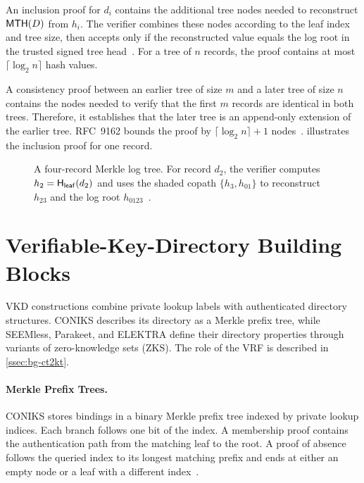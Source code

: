 An inclusion proof for $d_i$ contains the additional tree nodes needed to reconstruct $\mathsf{MTH}(D)$
from $h_i$. The verifier combines these nodes according to the leaf index and tree size, then
accepts only if the reconstructed value equals the log root in the trusted signed tree
head~\cite[Section~2.1.3]{rfc9162}. For a tree of $n$ records, the proof contains at most
$\lceil\log_2 n\rceil$ hash values.

A consistency proof between an earlier tree of size $m$ and a later tree of size $n$ contains the
nodes needed to verify that the first $m$ records are identical in both trees. Therefore, it
establishes that the later tree is an append-only extension of the earlier tree. RFC~9162 bounds the
proof by $\lceil\log_2 n\rceil+1$ nodes~\cite[Section~2.1.4.1]{rfc9162}.
 illustrates the inclusion proof for one record.

\begin{figure}[H]
\centering

\caption[A Merkle log tree and inclusion proof.]{A four-record Merkle log tree. For record $d_2$,
the verifier computes $h_2=\mathsf{H}_{\mathsf{leaf}}(d_2)$ and uses the shaded copath
$\{h_3,h_{01}\}$ to reconstruct $h_{23}$ and the log root
$h_{0123}$~\cite[Section~2.1.3]{rfc9162}.}
\label{fig:bg-merkle}
\end{figure}

\section{Verifiable-Key-Directory Building Blocks}\label{sec:ext-vkd-blocks}

VKD constructions combine private lookup labels with authenticated directory structures. CONIKS
describes its directory as a Merkle prefix tree, while SEEMless, Parakeet, and ELEKTRA define their
directory properties through variants of zero-knowledge sets (ZKS). The role of the VRF is described
in \cref{ssec:bg-ct2kt}.

\paragraph{Merkle Prefix Trees.} CONIKS stores bindings in a binary Merkle prefix tree indexed by
private lookup indices. Each branch follows one bit of the index. A membership proof contains the
authentication path from the matching leaf to the root. A proof of absence follows the queried index
to its longest matching prefix and ends at either an empty node or a leaf with a different
index~\cite[Sections~3.1--3.2]{melara2015coniks}.

